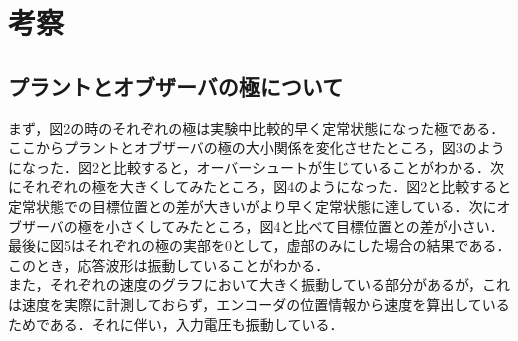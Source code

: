\documentclass[11pt,a4paper]{jsarticle}
\begin{document}
\newpage
 \section{考察}
  \subsection{プラントとオブザーバの極について}
  まず，図2の時のそれぞれの極は実験中比較的早く定常状態になった極である．ここからプラントとオブザーバの極の大小関係を変化させたところ，図3のようになった．図2と比較すると，オーバーシュートが生じていることがわかる．次にそれぞれの極を大きくしてみたところ，図4のようになった．図2と比較すると定常状態での目標位置との差が大きいがより早く定常状態に達している．次にオブザーバの極を小さくしてみたところ，図4と比べて目標位置との差が小さい．最後に図5はそれぞれの極の実部を0として，虚部のみにした場合の結果である．このとき，応答波形は振動していることがわかる．\\
  また，それぞれの速度のグラフにおいて大きく振動している部分があるが，これは速度を実際に計測しておらず，エンコーダの位置情報から速度を算出しているためである．それに伴い，入力電圧も振動している．
\end{document}
